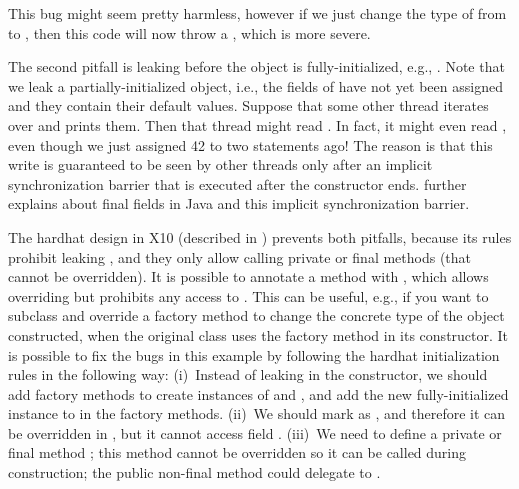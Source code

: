 This bug might seem pretty harmless,
    however if we just change the type of  from  to ,
    then this code will now throw a ,
    which is more severe.

The second pitfall is leaking \this before the object is fully-initialized,
    e.g., .
Note that we leak a partially-initialized object, i.e.,
    the fields of  have not yet been assigned and they contain their default values.
Suppose that some other thread iterates over  and prints them.
Then that thread might read .
In fact, it might even read , even though we just assigned 42 to  two statements ago!
The reason is that this write is guaranteed to be seen by other threads only
    after an implicit synchronization barrier that is executed after the constructor ends.
 further explains about final fields in Java and this implicit synchronization barrier.



The hardhat design in X10 (described in )
    prevents both pitfalls,
    because its rules prohibit leaking \this,
    and they only allow calling private or final methods (that cannot be overridden).
It is possible to annotate a method with ,
    which allows overriding but prohibits any access to \this.  This can be useful, e.g., if you want to subclass and override a factory method to change the concrete type of the object constructed, when the original class uses the factory method in its constructor.
It is possible to fix the bugs in this example by following the hardhat initialization rules
    in the following way:
    (i)~Instead of leaking \this in the constructor,
        we should add factory methods to create instances of  and ,
        and add the new fully-initialized instance to  in the factory methods.
    (ii)~We should mark  as ,
        and therefore it can be overridden in , but it cannot access field .
    (iii)~We need to define a private or final method ;
        this method cannot be overridden so it can be called during construction;
        the public non-final method  could delegate to .



